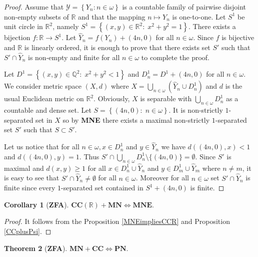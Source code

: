 \documentclass[11pt, reqno]{amsart}
\theoremstyle{definition}
\newtheorem{theorem}{Theorem}
\numberwithin{theorem}{section}
\theoremstyle{definition}
\theoremstyle{definition}
\theoremstyle{definition}
\theoremstyle{definition}
\newcommand{\brac}[1]{\left({#1}\right)}
\theoremstyle{definition}
\numberwithin{claim}{section}
\theoremstyle{definition}
\theoremstyle{definition}
\newtheorem{corollary}[theorem]{Corollary}
\theoremstyle{definition}
\theoremstyle{definition}
\theoremstyle{definition}
\theoremstyle{remboldstyle}
\begin{document}
\begin{proof}
Assume that $\mathcal{Y} = \left\{Y_n \colon n \in \omega\right\}$ is a countable family of pairwise disjoint non-empty subsets of $\mathbb{R}$ and that the mapping $n \mapsto Y_n$ is one-to-one. Let $S^1$ be unit circle in $\mathbb{R}^2$, namely $S^1 = \left\{(x, y) \in \mathbb{R}^2\colon\; x^2 + y^2 = 1\right\}$. There exists a bijection $f\colon \mathbb{R} \to S^1$. Let $\widehat{Y}_n = f(Y_n) + (4n, 0)$ for all $n \in \omega$. Since $f$ is bijective and $\mathbb{R}$ is linearly ordered, it is enough to prove that there exists set $S'$ such that $S' \cap \widehat{Y}_n$ is non-empty and finite for all $n \in \omega$ to complete the proof.

Let $D^1 = \left\{(x, y) \in \mathbb{Q}^2\colon\; x^2 + y^2 < 1\right\}$ and $D_n^1 = D^1 + (4n, 0)$ for all $n \in \omega$. We consider metric space $(X, d)$ where $X = \bigcup_{n \in \omega} \brac{\widehat{Y}_n \cup D_n^1}$ and $d$ is the usual Euclidean metric on $\mathbb{R}^2$. Obviously, $X$ is separable with $\bigcup_{n \in \omega} D_n^1$ as a countable and dense set. Let $S = \left\{(4n, 0)\colon\; n \in \omega\right\}$. It is non-strictly $1$-separated set in $X$ so by \textbf{MNE} there exists a maximal non-strictly $1$-separated set $S'$ such that $S \subset S'$.

Let us notice that for all $n \in \omega, x \in D_n^1$ and $y \in \widehat{Y}_n$ we have $d\brac{(4n, 0), x} < 1$ and $d\brac{(4n, 0), y} = 1$. Thus $S' \cap \bigcup_{n \in \omega} D_n^1 \setminus \{(4n,0)\} = \emptyset$. Since $S'$ is maximal and $d(x, y) \ge 1$ for all $x \in D_n^1 \cup \widehat{Y}_n$ and $y \in D_m^1 \cup \widehat{Y}_m$ where $n \neq m$, it is easy to see that $S' \cap \widehat{Y}_n \neq \emptyset$ for all $n \in \omega$. Moreover for all $n \in \omega$ set $S' \cap \widehat{Y}_n$ is finite since every $1$-separated set contained in $S^1 + (4n, 0)$ is finite.
\end{proof}

\begin{corollary}[\textbf{ZFA}]
$\textbf{CC}(\mathbb{R}) + \textbf{MN} \iff \textbf{MNE}$.
\end{corollary}

\begin{proof}
It follows from the Proposition \ref{MNEimpliesCCR} and Proposition \ref{CCplusPsi}.
\end{proof}



\begin{theorem}[\textbf{ZFA}] \label{T:MN+CCtoPN}
$\textbf{MN} + \textbf{CC} \iff \textbf{PN}$.
\end{theorem}
\end{document}
